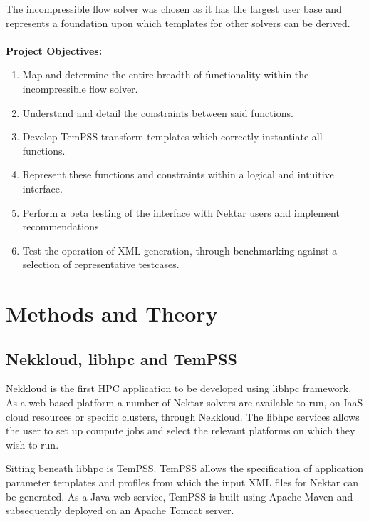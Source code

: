 \documentclass[11pt, a4paper]{report}
\begin{document}
The incompressible flow solver was chosen as it has the largest user base and represents a foundation upon which templates for other solvers can be derived.
\\ \vspace{.25cm} \\
\textbf{Project Objectives:}
\begin{enumerate}
\item Map and determine the entire breadth of functionality within the incompressible flow solver.
\item Understand and detail the constraints between said functions.
\item Develop TemPSS transform templates which correctly instantiate all functions.
\item Represent these functions and constraints within a logical and intuitive interface.
\item Perform a beta testing of the interface with Nektar users and implement recommendations.
\item Test the operation of XML generation, through benchmarking against a selection of representative testcases.
\end{enumerate}

\newpage
\chapter{Methods and Theory}

\section{Nekkloud, libhpc and TemPSS}
Nekkloud is the first HPC application to be developed using libhpc framework. As a web-based platform a number of Nektar solvers are available to run, on IaaS cloud resources or specific clusters, through Nekkloud. The libhpc services allows the user to set up compute jobs and select the relevant platforms on which they wish to run.

Sitting beneath libhpc is TemPSS. TemPSS allows the specification of application parameter templates and profiles from which the input XML files for Nektar can be generated. As a Java web service, TemPSS is built using Apache Maven and subsequently deployed on an Apache Tomcat server.
\end{document}
